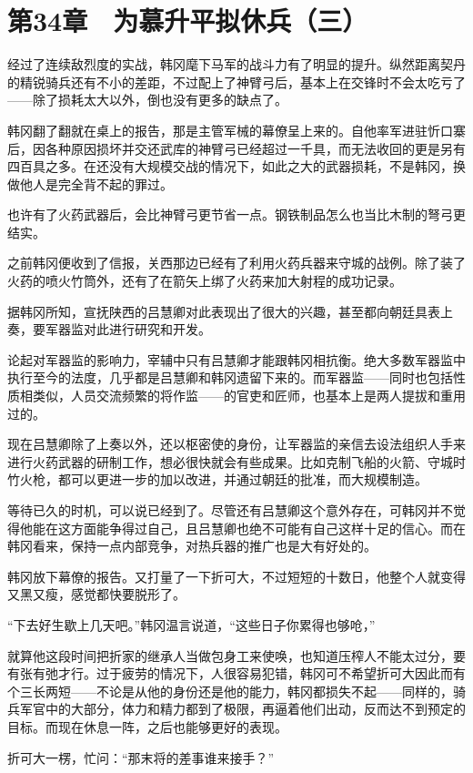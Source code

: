 \section{第34章　为慕升平拟休兵（三）}

经过了连续敌烈度的实战，韩冈麾下马军的战斗力有了明显的提升。纵然距离契丹的精锐骑兵还有不小的差距，不过配上了神臂弓后，基本上在交锋时不会太吃亏了——除了损耗太大以外，倒也没有更多的缺点了。

韩冈翻了翻就在桌上的报告，那是主管军械的幕僚呈上来的。自他率军进驻忻口寨后，因各种原因损坏并交还武库的神臂弓已经超过一千具，而无法收回的更是另有四百具之多。在还没有大规模交战的情况下，如此之大的武器损耗，不是韩冈，换做他人是完全背不起的罪过。

也许有了火药武器后，会比神臂弓更节省一点。钢铁制品怎么也当比木制的弩弓更结实。

之前韩冈便收到了信报，关西那边已经有了利用火药兵器来守城的战例。除了装了火药的喷火竹筒外，还有了在箭矢上绑了火药来加大射程的成功记录。

据韩冈所知，宣抚陕西的吕慧卿对此表现出了很大的兴趣，甚至都向朝廷具表上奏，要军器监对此进行研究和开发。

论起对军器监的影响力，宰辅中只有吕慧卿才能跟韩冈相抗衡。绝大多数军器监中执行至今的法度，几乎都是吕慧卿和韩冈遗留下来的。而军器监——同时也包括性质相类似，人员交流频繁的将作监——的官吏和匠师，也基本上是两人提拔和重用过的。

现在吕慧卿除了上奏以外，还以枢密使的身份，让军器监的亲信去设法组织人手来进行火药武器的研制工作，想必很快就会有些成果。比如克制飞船的火箭、守城时竹火枪，都可以更进一步的加以改进，并通过朝廷的批准，而大规模制造。

等待已久的时机，可以说已经到了。尽管还有吕慧卿这个意外存在，可韩冈并不觉得他能在这方面能争得过自己，且吕慧卿也绝不可能有自己这样十足的信心。而在韩冈看来，保持一点内部竞争，对热兵器的推广也是大有好处的。

韩冈放下幕僚的报告。又打量了一下折可大，不过短短的十数日，他整个人就变得又黑又瘦，感觉都快要脱形了。

“下去好生歇上几天吧。”韩冈温言说道，“这些日子你累得也够呛，”

就算他这段时间把折家的继承人当做包身工来使唤，也知道压榨人不能太过分，要有张有弛才行。过于疲劳的情况下，人很容易犯错，韩冈可不希望折可大因此而有个三长两短——不论是从他的身份还是他的能力，韩冈都损失不起——同样的，骑兵军官中的大部分，体力和精力都到了极限，再逼着他们出动，反而达不到预定的目标。而现在休息一阵，之后也能够更好的表现。

折可大一楞，忙问：“那末将的差事谁来接手？”

